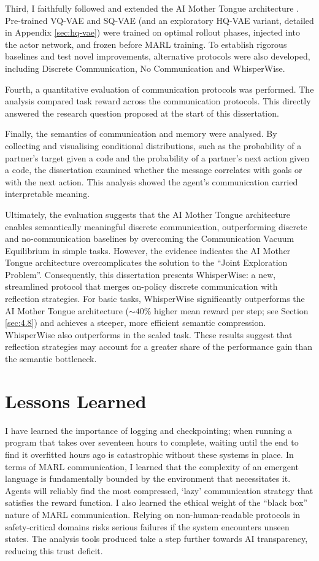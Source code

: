Third, I faithfully followed and extended the AI Mother Tongue architecture \cite{AIMotherTongue}.
Pre-trained VQ-VAE and SQ-VAE (and an exploratory HQ-VAE variant, detailed in Appendix \ref{sec:hq-vae}) were trained on optimal rollout phases, injected into the actor network, and frozen before MARL training.
To establish rigorous baselines and test novel improvements, alternative protocols were also developed, including Discrete Communication, No Communication and WhisperWise.

Fourth, a quantitative evaluation of communication protocols was performed.
The analysis compared task reward across the communication protocols.
This directly answered the research question proposed at the start of this dissertation.

Finally, the semantics of communication and memory were analysed.
By collecting and visualising conditional distributions, such as the probability of a partner's target given a code and the probability of a partner's next action given a code, the dissertation examined whether the message correlates with goals or with the next action.
This analysis showed the agent's communication carried interpretable meaning.

Ultimately, the evaluation suggests that the AI Mother Tongue architecture enables semantically meaningful discrete communication, outperforming discrete and no-communication baselines by overcoming the Communication Vacuum Equilibrium in simple tasks.
However, the evidence indicates the AI Mother Tongue architecture overcomplicates the solution to the ``Joint Exploration Problem''.
Consequently, this dissertation presents WhisperWise: a new, streamlined protocol that merges on-policy discrete communication with reflection strategies.
For basic tasks, WhisperWise significantly outperforms the AI Mother Tongue architecture ($\sim 40\%$ higher mean reward per step; see Section \ref{sec:4.8}) and achieves a steeper, more efficient semantic compression.
WhisperWise also outperforms in the scaled task.
These results suggest that reflection strategies may account for a greater share of the performance gain than the semantic bottleneck.

\section{Lessons Learned}
\label{sec:5.2}

I have learned the importance of logging and checkpointing; when running a program that takes over seventeen hours to complete, waiting until the end to find it overfitted hours ago is catastrophic without these systems in place.
In terms of MARL communication, I learned that the complexity of an emergent language is fundamentally bounded by the environment that necessitates it.
Agents will reliably find the most compressed, `lazy' communication strategy that satisfies the reward function.
I also learned the ethical weight of the ``black box'' nature of MARL communication.
Relying on non-human-readable protocols in safety-critical domains risks serious failures if the system encounters unseen states.
The analysis tools produced take a step further towards AI transparency, reducing this trust deficit.


